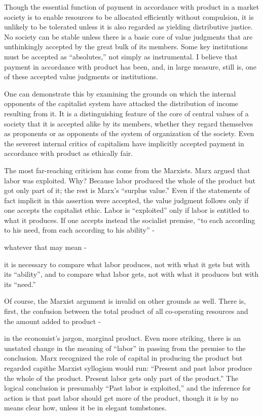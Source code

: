 \documentclass[11pt,openany]{book}
\begin{document}
Though the essential function of payment in accordance with product in a market society is to enable resources to be allocated efficiently without compulsion, it is unlikely to be tolerated unless it is also regarded as yielding distributive justice. No society can be stable unless there is a basic core of value judgments that are unthinkingly accepted by the great bulk of its members. Some key institutions must be accepted as ``absolutes,'' not simply as instrumental. I believe that payment in accordance with product has been, and, in large measure, still is, one of these accepted value judgments or institutions.

One can demonstrate this by examining the grounds on which the internal opponents of the capitalist system have attacked the distribution of income resulting from it. It is a distinguishing feature of the core of central values of a society that it is accepted alike by its members, whether they regard themselves as proponents or as opponents of the system of organization of the society. Even the severest internal critics of capitalism have implicitly accepted payment in accordance with product as ethically fair.

The most far-reaching criticism has come from the Marxists. Marx argued that labor was exploited. Why? Because labor produced the whole of the product but got only part of it; the rest is Marx's ``surplus value.'' Even if the statements of fact implicit in this assertion were accepted, the value judgment follows only if one accepts the capitalist ethic. Labor is ``exploited'' only if labor is entitled to what it produces. If one accepts instead the socialist premise, ``to each according to his need, from each according to his ability'' -

whatever that may mean -

it is necessary to compare what labor produces, not with what it gets but with its ``ability'', and to compare what labor gets, not with what it produces but with its ``need.''

Of course, the Marxist argument is invalid on other grounds as well. There is, first, the confusion between the total product of all co-operating resources and the amount added to product -

in the economist's jargon, marginal product. Even more striking, there is an unstated change in the meaning of ``labor'' in passing from the premise to the conclusion. Marx recognized the role of capital in producing the product but regarded capithe Marxist syllogism would run: ``Present and past labor produce the whole of the product. Present labor gets only part of the product.'' The logical conclusion is presumably ``Past labor is exploited,'' and the inference for action is that past labor should get more of the product, though it is by no means clear how, unless it be in elegant tombstones.
\end{document}
